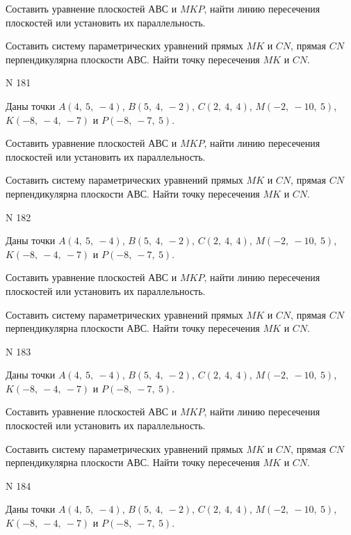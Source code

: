 \documentclass[11pt]{report}
\begin{document}
Составить уравнение плоскостей $АВС$ и $MKP$,
найти линию пересечения плоскостей или установить их параллельность.

Составить систему параметрических уравнений прямых $MK$ и $CN$,
прямая $CN$ перпендикулярна плоскости $АВС$. 
Найти точку пересечения $MK$ и $CN$.



 N 181

Даны точки $A\left( 4, \  5, \  -4\right)$, $B\left( 5, \  4, \  -2\right)$, $C\left( 2, \  4, \  4\right)$, $M\left( -2, \  -10, \  5\right)$, $K\left( -8, \  -4, \  -7\right)$ и $P\left( -8, \  -7, \  5\right)$.


Составить уравнение плоскостей $АВС$ и $MKP$,
найти линию пересечения плоскостей или установить их параллельность.

Составить систему параметрических уравнений прямых $MK$ и $CN$,
прямая $CN$ перпендикулярна плоскости $АВС$. 
Найти точку пересечения $MK$ и $CN$.



 N 182

Даны точки $A\left( 4, \  5, \  -4\right)$, $B\left( 5, \  4, \  -2\right)$, $C\left( 2, \  4, \  4\right)$, $M\left( -2, \  -10, \  5\right)$, $K\left( -8, \  -4, \  -7\right)$ и $P\left( -8, \  -7, \  5\right)$.


Составить уравнение плоскостей $АВС$ и $MKP$,
найти линию пересечения плоскостей или установить их параллельность.

Составить систему параметрических уравнений прямых $MK$ и $CN$,
прямая $CN$ перпендикулярна плоскости $АВС$. 
Найти точку пересечения $MK$ и $CN$.



 N 183

Даны точки $A\left( 4, \  5, \  -4\right)$, $B\left( 5, \  4, \  -2\right)$, $C\left( 2, \  4, \  4\right)$, $M\left( -2, \  -10, \  5\right)$, $K\left( -8, \  -4, \  -7\right)$ и $P\left( -8, \  -7, \  5\right)$.


Составить уравнение плоскостей $АВС$ и $MKP$,
найти линию пересечения плоскостей или установить их параллельность.

Составить систему параметрических уравнений прямых $MK$ и $CN$,
прямая $CN$ перпендикулярна плоскости $АВС$. 
Найти точку пересечения $MK$ и $CN$.



 N 184

Даны точки $A\left( 4, \  5, \  -4\right)$, $B\left( 5, \  4, \  -2\right)$, $C\left( 2, \  4, \  4\right)$, $M\left( -2, \  -10, \  5\right)$, $K\left( -8, \  -4, \  -7\right)$ и $P\left( -8, \  -7, \  5\right)$.
\end{document}
